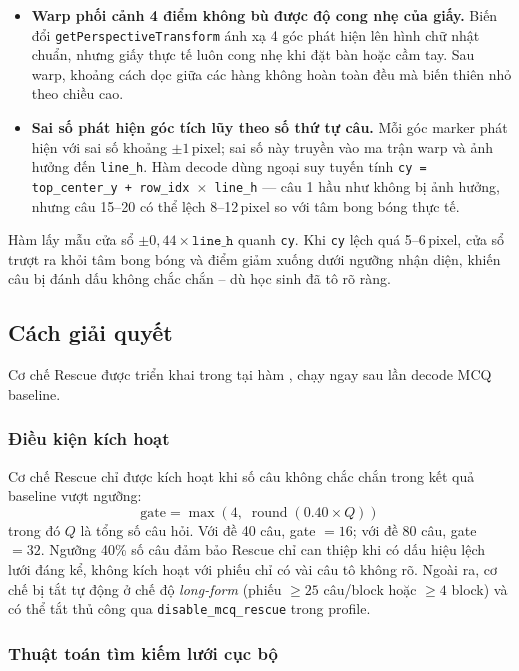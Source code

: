 \begin{itemize}[leftmargin=1.5cm]
  \item \textbf{Warp phối cảnh 4 điểm không bù được độ cong nhẹ của giấy.}
    Biến đổi \texttt{getPerspectiveTransform} ánh xạ 4 góc phát hiện lên hình chữ nhật chuẩn, nhưng giấy thực tế luôn cong nhẹ khi đặt bàn hoặc cầm tay. Sau warp, khoảng cách dọc giữa các hàng không hoàn toàn đều mà biến thiên nhỏ theo chiều cao.
  \item \textbf{Sai số phát hiện góc tích lũy theo số thứ tự câu.}
    Mỗi góc marker phát hiện với sai số khoảng $\pm 1$\,pixel; sai số này truyền vào ma trận warp và ảnh hưởng đến \texttt{line\_h}. Hàm decode dùng ngoại suy tuyến tính \texttt{cy = top\_center\_y + row\_idx $\times$ line\_h} — câu 1 hầu như không bị ảnh hưởng, nhưng câu 15–20 có thể lệch 8–12\,pixel so với tâm bong bóng thực tế.
\end{itemize}

Hàm  lấy mẫu cửa sổ $\pm 0{,}44 \times \texttt{line\_h}$ quanh \texttt{cy}. Khi \texttt{cy} lệch quá 5–6\,pixel, cửa sổ trượt ra khỏi tâm bong bóng và điểm giảm xuống dưới ngưỡng nhận diện, khiến câu bị đánh dấu không chắc chắn -- dù học sinh đã tô rõ ràng.

\subsection{Cách giải quyết}

Cơ chế Rescue được triển khai trong  tại hàm , chạy ngay sau lần decode MCQ baseline.

\subsubsection*{Điều kiện kích hoạt}

Cơ chế Rescue chỉ được kích hoạt khi số câu không chắc chắn trong kết quả baseline vượt ngưỡng:
$$\text{gate} = \max\!\left(4,\; \operatorname{round}(0.40 \times Q)\right)$$
trong đó $Q$ là tổng số câu hỏi. Với đề 40 câu, gate $= 16$; với đề 80 câu, gate $= 32$. Ngưỡng 40\% số câu đảm bảo Rescue chỉ can thiệp khi có dấu hiệu lệch lưới đáng kể, không kích hoạt với phiếu chỉ có vài câu tô không rõ. Ngoài ra, cơ chế bị tắt tự động ở chế độ \textit{long-form} (phiếu $\geq 25$ câu/block hoặc $\geq 4$ block) và có thể tắt thủ công qua \texttt{disable\_mcq\_rescue} trong profile.

\subsubsection*{Thuật toán tìm kiếm lưới cục bộ}

